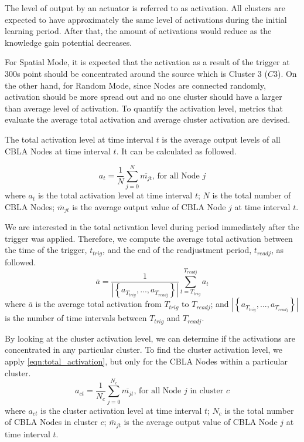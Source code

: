 The level of output by an actuator is referred to as activation. All clusters are expected to have approximately the same level of activations during the initial learning period. After that, the amount of activations would reduce as the knowledge gain potential decreases. 

For Spatial Mode, it is expected that the activation as a result of the trigger at 300s point should be concentrated around the source which is Cluster 3 ($C3$). On the other hand, for Random Mode, since Nodes are connected randomly, activation should be more spread out and no one cluster should have a larger than average level of activation. To quantify the activation level, metrics that evaluate the average total activation and average cluster activation are devised.

The total activation level at time interval $t$ is the average output levels of all CBLA Nodes at time interval $t$. It can be calculated as followed.
 
\begin{equation}\label{eqn:total_activation}
	a_t = \frac{1}{N} \sum_{j=0}^{N} \overline{m_{jt}} \text{, for all Node $j$}
\end{equation}
where $a_t$ is the total activation level at time interval $t$; $N$ is the total number of CBLA Nodes; $\overline{m}_{jt}$ is the average output value of CBLA Node $j$ at time interval $t$.

We are interested in the total activation level during period immediately after the trigger was applied. Therefore, we compute the average total activation between the time of the trigger, $t_{trig}$, and the end of the readjustment period, $t_{readj}$, as followed.
\begin{equation}\label{eqn:average_total_activation}
\overline{a} = \frac{1}{| \left\{ a_{T_{trig}}, ... , a_{T_{readj}} \right\}|} \sum_{t=T_{trig}}^{T_{readj}} a_{t}
\end{equation}
where $\overline{a}$ is the average total activation from $T_{trig}$ to $T_{readj}$; and $| \left\{ a_{T_{trig}}, ..., a_{T_{readj}} \right\}|$ is the number of time intervals between $T_{trig}$ and $T_{readj}$.

By looking at the cluster activation level, we can determine if the activations are concentrated in any particular cluster. 
To find the cluster activation level, we apply \eqref{eqn:total_activation}, but only for the CBLA Nodes within a particular cluster.
\begin{equation}\label{eqn:cluster_activation}
	a_{ct} = \frac{1}{N_c} \sum_{j=0}^{N_c} \overline{m_{jt}} \text{, for all Node $j$ in cluster $c$}
\end{equation}
where $a_{ct}$ is the cluster activation level at time interval $t$; $N_c$ is the total number of CBLA Nodes in cluster $c$; $\overline{m}_{jt}$ is the average output value of CBLA Node $j$ at time interval $t$.

